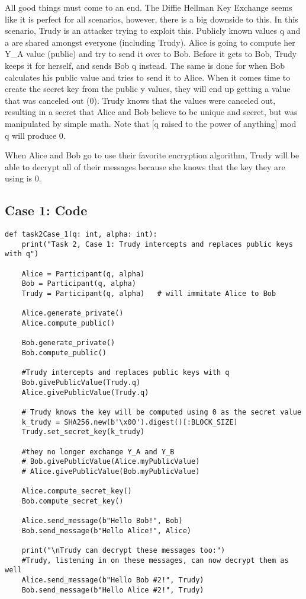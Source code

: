 \documentclass[11pt]{article}
\begin{document}
All good things must come to an end. The Diffie Hellman Key Exchange seems like it is perfect for all scenarios, however, there is a big downside to this. In this scenario, Trudy is an attacker trying to exploit this. Publicly known values q and a are shared amongst everyone (including Trudy). Alice is going to compute her Y\_A value (public) and try to send it over to Bob. Before it gets to Bob, Trudy keeps it for herself, and sends Bob q instead. The same is done for when Bob calculates his public value and tries to send it to Alice. When it comes time to create the secret key from the public y values, they will end up getting a value that was canceled out (0). Trudy knows that the values were canceled out, resulting in a secret that Alice and Bob believe to be unique and secret, but was manipulated by simple math. Note that [q raised to the power of anything] mod q will produce 0.

When Alice and Bob go to use their favorite encryption algorithm, Trudy will be able to decrypt all of their messages because she knows that the key they are using is 0. 

\subsection*{Case 1: Code}

\begin{lstlisting}
def task2Case_1(q: int, alpha: int):
    print("Task 2, Case 1: Trudy intercepts and replaces public keys with q")

    Alice = Participant(q, alpha)
    Bob = Participant(q, alpha)
    Trudy = Participant(q, alpha)   # will immitate Alice to Bob

    Alice.generate_private()
    Alice.compute_public()

    Bob.generate_private()
    Bob.compute_public()

    #Trudy intercepts and replaces public keys with q
    Bob.givePublicValue(Trudy.q)
    Alice.givePublicValue(Trudy.q)  

    # Trudy knows the key will be computed using 0 as the secret value
    k_trudy = SHA256.new(b'\x00').digest()[:BLOCK_SIZE] 
    Trudy.set_secret_key(k_trudy)

    #they no longer exchange Y_A and Y_B
    # Bob.givePublicValue(Alice.myPublicValue)
    # Alice.givePublicValue(Bob.myPublicValue)

    Alice.compute_secret_key()
    Bob.compute_secret_key()

    Alice.send_message(b"Hello Bob!", Bob)
    Bob.send_message(b"Hello Alice!", Alice)

    print("\nTrudy can decrypt these messages too:")
    #Trudy, listening in on these messages, can now decrypt them as well
    Alice.send_message(b"Hello Bob #2!", Trudy)
    Bob.send_message(b"Hello Alice #2!", Trudy)

\end{lstlisting}
\end{document}
